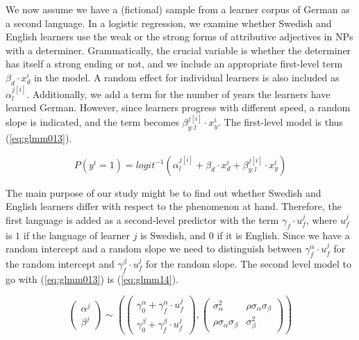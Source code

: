 \documentclass[a4paper,12pt]{article}
\begin{document}
We now assume we have a (fictional) sample from a learner corpus of German as a second language.
In a logistic regression, we examine whether Swedish and English learners use the weak or the strong forms of attributive adjectives in NPs with a determiner.
Grammatically, the crucial variable is whether the determiner has itself a strong ending or not, and we include an appropriate first-level term $\beta_d\cdot x_d^i$ in the model.
A random effect for individual learners is also included as $\alpha_l^{j[i]}$.
Additionally, we add a term for the number of years the learners have learned German.
However, since learners progress with different speed, a random slope is indicated, and the term becomes $\beta_{y:l}^{j[i]}\cdot x_y^i$.
The first-level model is thus (\ref{eq:glmm013}).

\begin{equation}
  P(y^i=1)=logit^{-1}(\alpha_l^{j[i]} + \beta_d\cdot x_d^i + \beta_{y:l}^{j[i]}\cdot x_y^i)
  \label{eq:glmm013}
\end{equation}

The main purpose of our study might be to find out whether Swedish and English learners differ with respect to the phenomenon at hand.
Therefore, the first language is added as a second-level predictor with the term $\gamma_f\cdot u_f^j$, where $u_f^j$ is $1$ if the language of learner $j$ is Swedish, and $0$ if it is English.
Since we have a random intercept and a random slope we need to distinguish between $\gamma_f^{\alpha}\cdot u_f^j$ for the random intercept and $\gamma_f^{\beta}\cdot u_f^j$ for the random slope.
The second level model to go with (\ref{eq:glmm013}) is (\ref{eq:glmm14}).

\begin{equation} 
  \left( \begin{smallmatrix} \alpha^j \\ \beta^j \end{smallmatrix}\right) \sim
    \left(
    \left( \begin{smallmatrix} \gamma_0^{\alpha}+\gamma_f^{\alpha}\cdot u_f^j \\ \gamma_0^{\beta}+\gamma_f^{\beta}\cdot u_f^j    \end{smallmatrix} \right), 
      \left( \begin{smallmatrix} \sigma_{\alpha}^2 & \rho\sigma_{\alpha}\sigma_{\beta} \\
	\rho\sigma_{\alpha}\sigma_{\beta} & \sigma_{\beta}^2 \end{smallmatrix} \right)
    \right)
  \label{eq:glmm14}
\end{equation}
\end{document}

